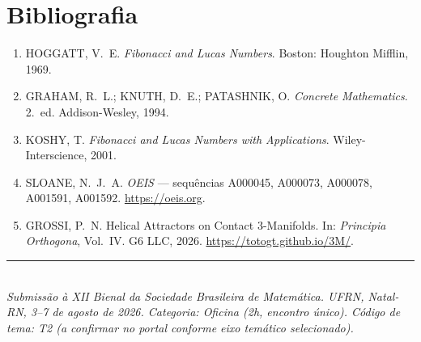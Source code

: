 \documentclass[11pt,a4paper]{article}
\begin{document}
\section*{Bibliografia}

\begin{enumerate}[leftmargin=2em,itemsep=0em]
  \item HOGGATT, V.~E. \emph{Fibonacci and Lucas Numbers}. Boston: Houghton Mifflin, 1969.
  \item GRAHAM, R.~L.; KNUTH, D.~E.; PATASHNIK, O. \emph{Concrete Mathematics}. 2.~ed. Addison-Wesley, 1994.
  \item KOSHY, T. \emph{Fibonacci and Lucas Numbers with Applications}. Wiley-Interscience, 2001.
  \item SLOANE, N.~J.~A. \emph{OEIS} --- sequências A000045, A000073, A000078, A001591, A001592. \url{https://oeis.org}.
  \item GROSSI, P.~N. Helical Attractors on Contact 3-Manifolds. In: \emph{Principia Orthogona}, Vol.~IV. G6 LLC, 2026. \url{https://totogt.github.io/3M/}.
\end{enumerate}

\vspace{1em}
\noindent\rule{\linewidth}{0.3pt}\\[0.3em]
\footnotesize
\emph{Submissão à XII Bienal da Sociedade Brasileira de Matemática. UFRN, Natal-RN, 3--7 de agosto de 2026. Categoria: Oficina (2h, encontro único). Código de tema: T2 (a confirmar no portal conforme eixo temático selecionado).}
\end{document}
